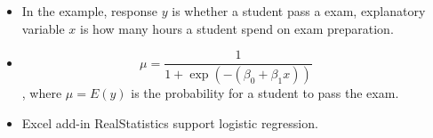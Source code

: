 \documentclass[11pt]{beamer}
\begin{document}
\begin{frame}
\begin{columns}
\begin{column}{0.3\textwidth}
    \end{column}
    \begin{column}{0.7\textwidth}
        \begin{itemize}
            \item In the example, response $y$ is whether a student pass a exam, explanatory variable $x$ is how many hours a student spend on exam preparation.
            \item $$\mu=\frac{1}{1+\exp (-(\beta_0+\beta_1x))}$$, where $\mu=E(y)$ is the probability for a student to pass the exam.
            \item Excel add-in RealStatistics support logistic regression.
        \end{itemize}
    \end{column}
\end{columns}

\end{frame}
\end{document}
